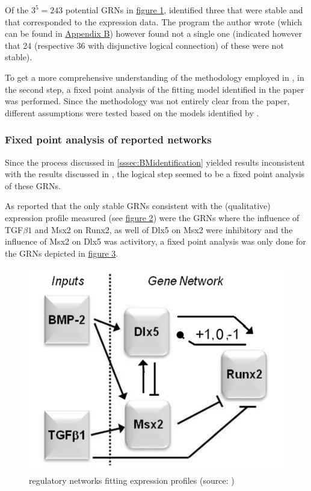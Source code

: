 \documentclass[11pt]{article}
\begin{document}
Of the $3^{5}=243$ potential GRNs in \hyperref[GRNs]{figure 1}, \cite{Kirkham} identified three that were stable and that corresponded to the expression data. The program the author wrote (which can be found in \hyperref[AppendixB]{Appendix B}) however found not a single one (indicated however that 24 (respective 36 with disjunctive logical connection) of these were not stable). 

To get a more comprehensive understanding of the methodology employed in \cite{Kirkham}, in the second step, a fixed point analysis of the fitting model identified in the paper was performed. Since the methodology was not entirely clear from the paper, different assumptions were tested based on the models identified by \cite{Kirkham}.

\subsubsection{Fixed point analysis of reported networks} \label{sssec:FPanalysis}
Since the process discussed in \ref{sssec:BMidentification} yielded results inconsistent with the results discussed in \cite{Kirkham}, the logical step seemed to be a fixed point analysis of these GRNs.

As \cite{Kirkham} reported that the only stable GRNs consistent with the (qualitative) expression profile measured (see \hyperref[table1]{figure 2}) were the GRNs where the influence of TGF$\beta1$ and Msx2 on Runx2, as well of Dlx5 on Msx2 were inhibitory and the influence of Msx2 on Dlx5 was activitory, a fixed point analysis was only done for the GRNs depicted in \hyperref[FPGRNs]{figure 3}.

\begin{figure}[!htb]
  \centering
  \includegraphics[scale=0.25]{regulatory_network_results.jpg} 	  	
  \caption{\label{FPGRNs} regulatory networks fitting expression profiles (source: \cite{Kirkham})}
\end{figure}
\end{document}
